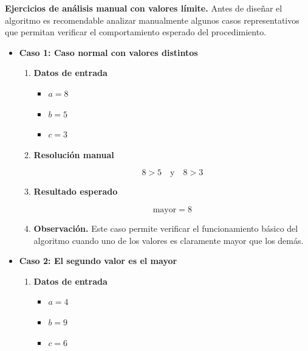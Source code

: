 \documentclass[12pt,twoside]{book}
\begin{document}
						\noindent
						\textbf{Ejercicios de análisis manual con valores límite.}
						Antes de diseñar el algoritmo es recomendable analizar manualmente algunos casos representativos que permitan verificar el comportamiento esperado del procedimiento.
						
						\begin{itemize}
							
							\item \textbf{Caso 1: Caso normal con valores distintos}
							
							\begin{enumerate}
								\item \textbf{Datos de entrada}
								
								\begin{itemize}
									\item $a = 8$
									\item $b = 5$
									\item $c = 3$
								\end{itemize}
								
								\item \textbf{Resolución manual}
								
								\[
								8 > 5 \quad \text{y} \quad 8 > 3
								\]
								
								\item \textbf{Resultado esperado}
								
								\[
								\text{mayor} = 8
								\]
								
								\item \textbf{Observación.}  
								Este caso permite verificar el funcionamiento básico del algoritmo cuando uno de los valores es claramente mayor que los demás.
								
							\end{enumerate}
							
							
							\item \textbf{Caso 2: El segundo valor es el mayor}
							
							\begin{enumerate}
								
								\item \textbf{Datos de entrada}
								
								\begin{itemize}
									\item $a = 4$
									\item $b = 9$
									\item $c = 6$
								\end{itemize}
								

\end{enumerate}
\end{itemize}
\end{document}
